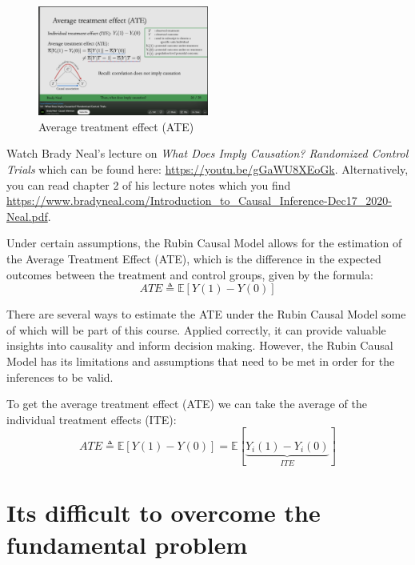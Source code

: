 \documentclass[
  12pt,
  oneside]{book}
\theoremstyle{definition}
\theoremstyle{definition}
\theoremstyle{definition}
\theoremstyle{definition}
\theoremstyle{remark}
\begin{document}
\begin{figure}
\centering
\includegraphics[width=0.5\textwidth,height=\textheight]{fig/neal-rct.png}
\caption[\label{fig:nealrct} Average treatment effect (ATE)]{\label{fig:nealrct} Average treatment effect (ATE)\footnotemark{}}
\end{figure}

Watch Brady Neal's lecture on \emph{What Does Imply Causation? Randomized Control Trials} which can be found here: \url{https://youtu.be/gGaWU8XEoGk}. Alternatively, you can read chapter 2 of his lecture notes \citep{Neal2020Introduction} which you find \url{https://www.bradyneal.com/Introduction_to_Causal_Inference-Dec17_2020-Neal.pdf}.

Under certain assumptions, the Rubin Causal Model allows for the estimation of the Average Treatment Effect (ATE), which is the difference in the expected outcomes between the treatment and control groups, given by the formula:
\[
ATE\triangleq \mathbb{E}[Y(1)-Y(0)]
\]

There are several ways to estimate the ATE under the Rubin Causal Model some of which will be part of this course. Applied correctly, it can provide valuable insights into causality and inform decision making. However, the Rubin Causal Model has its limitations and assumptions that need to be met in order for the inferences to be valid.

To get the average treatment effect (ATE) we can take the average of the individual treatment effects (ITE):
\begin{equation}
  ATE\triangleq \mathbb{E}[Y(1)-Y(0)] = \mathbb{E} [\underbrace{Y_i(1)-Y_i(0)}_{ITE}]
\label{eq:feq}
\end{equation}

\hypertarget{its-difficult-to-overcome-the-fundamental-problem}{%
\section{Its difficult to overcome the fundamental problem}\label{its-difficult-to-overcome-the-fundamental-problem}}
\end{document}

